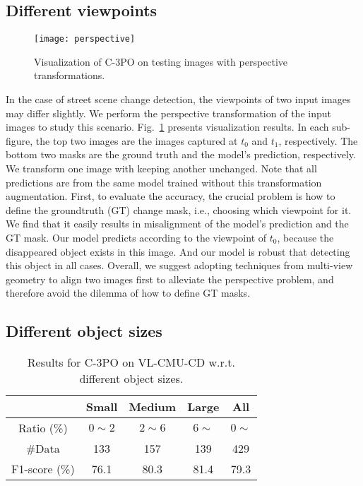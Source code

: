 \documentclass[review]{elsarticle}
\begin{document}
\subsection{Different viewpoints}
\label{sec:viewpoints}

\begin{figure}
	\centering
	\texttt{[image: perspective]}
	\caption{Visualization of C-3PO on testing images with perspective transformations.}
	\label{fig:perspective}
\end{figure}

In the case of street scene change detection, the viewpoints of two input images may differ slightly. We perform the perspective transformation of the input images to study this scenario. Fig.~\ref{fig:perspective} presents visualization results. In each sub-figure, the top two images are the images captured at $t_0$ and $t_1$, respectively. The bottom two masks are the ground truth and the model's prediction, respectively. We transform one image with keeping another unchanged. Note that all predictions are from the same model trained without this transformation augmentation. First, to evaluate the accuracy, the crucial problem is how to define the groundtruth (GT) change mask, i.e., choosing which viewpoint for it. We find that it easily results in misalignment of the model's prediction and the GT mask. Our model predicts according to the viewpoint of $t_0$, because the disappeared object exists in this image. And our model is robust that detecting this object in all cases. Overall, we suggest adopting techniques from multi-view geometry to align two images first to alleviate the perspective problem, and therefore avoid the dilemma of how to define GT masks.

\subsection{Different object sizes}
\label{sec:size}

\begin{table}
  \centering
  \small
  \caption{Results for C-3PO on VL-CMU-CD w.r.t. different object sizes.}
  \begin{tabular}{c|ccc|c}
    \hline
     & {Small} & {Medium} & {Large} & {All} \\
    \hline
    Ratio (\%) & $0\sim 2$ & $2\sim 6$ & $6\sim$ & $0\sim $\\
    \#Data & 133 & 157 & 139 & 429 \\
    \hline
    F1-score (\%) & 76.1 & 80.3 & 81.4 & 79.3 \\
    \hline
  \end{tabular}
  \label{tab:size}
\end{table}
\end{document}
